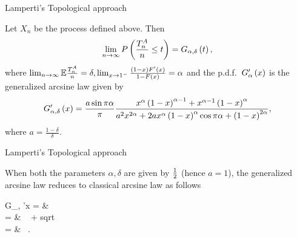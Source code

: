 \documentclass{beamer}
\begin{document}
\begin{frame}{Lamperti's Topological approach}
	\begin{Thm}
Let $X_n$ be the process defined above. Then
    \begin{equation}
\lim_{n \rightarrow \infty}P\left(\frac{T_n^A}{n} \leq t \right) =  G_{\alpha, \delta}\left( t \right),
    \end{equation}
    where $\lim_{n \rightarrow \infty}\mathbb{E} \frac{T_n^A}{n} = \delta, \lim_{x \rightarrow 1^-} \frac{\left( 1 - x \right) F'\left( x \right)}{1 - F\left( x \right)} = \alpha$ and the p.d.f.\ $G_{\alpha}'\left( x \right)$ is the generalized arcsine law given by
\begin{equation}
    G_{\alpha, \delta}'\left( x \right) = \frac{a\sin \pi \alpha}{\pi} \frac{x^{\alpha}\left( 1 - x \right)^{\alpha - 1} + x^{\alpha - 1}\left( 1 - x \right)^{\alpha}}{a^2x^{2\alpha} + 2ax^{\alpha}\left( 1 - x \right)^{\alpha}\cos \pi \alpha + \left( 1 - x \right)^{2\alpha}},
\end{equation}
where $a = \frac{1 - \delta}{\delta}$.
\end{Thm}
\end{frame}


\begin{frame}{Lamperti's Topological approach}
	\begin{Rem}
		When both the parameters $\alpha, \delta$ are given by $\frac{1}{2}$ (hence $a = 1$), the generalized arcsine law reduces to classical arcsine law as follows
		\bequn
			\begin{aligned}
				G_{\half, \half}'\lp x \rp = & \  		\\
				= & \  \lp {} + sqrt{} \rp 		\\
				= & \ .
			\end{aligned}
		\eequn
	\end{Rem}
\end{frame}
\end{document}
